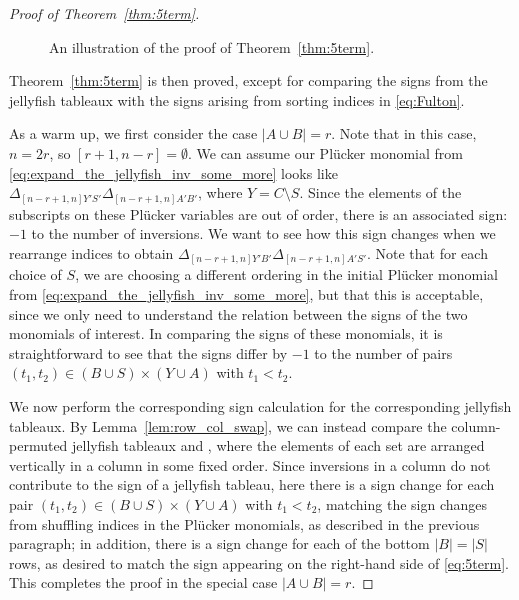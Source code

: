 \documentclass[10pt]{amsart}
\theoremstyle{definition}
\theoremstyle{plain}
\theoremstyle{plain}
\theoremstyle{definition}
\theoremstyle{remark}
\theoremstyle{plain}
\theoremstyle{plain}
\theoremstyle{plain}
\numberwithin{equation}{section}
\begin{document}
\begin{proof}[Proof of Theorem~\ref{thm:5term}]
\begin{figure}[htb]
    \centering
    \caption{An illustration of the proof of Theorem~\ref{thm:5term}.}
    \label{fig:jellyfish_sign_calc}
\end{figure}

Theorem~\ref{thm:5term} is then proved, except for comparing the signs from the jellyfish tableaux with the signs arising from sorting indices in \eqref{eq:Fulton}. 

As a warm up, we first consider the case $|A \cup B| = r$. Note that in this case, $n=2r$, so $[r+1,n-r]=\emptyset$.  We can assume our  Pl\"ucker monomial from \eqref{eq:expand_the_jellyfish_inv_some_more} looks like $\Delta_{[n-r+1,n]  Y'S'}\Delta_{[n-r+1,n]  A'B'}$, where $Y = C \setminus S$. Since the elements of the subscripts on these Pl\"ucker variables are out of order, there is an associated sign: $-1$ to the number of inversions. We want to see how this sign changes when we rearrange indices to obtain $\Delta_{[n-r+1,n]  Y'B'} \Delta_{[n-r+1,n]  A'S'}$.  Note that for each choice of $S$, we are choosing a different ordering in the initial Pl\"ucker monomial from \eqref{eq:expand_the_jellyfish_inv_some_more}, but that this is acceptable, since we only need to understand the relation between the signs of the two monomials of interest. In comparing the signs of these monomials, it is straightforward to see that the signs differ by $-1$ to the number of pairs $(t_1, t_2) \in (B \cup S) \times (Y \cup A)$ with $t_1 < t_2$.

We now perform the corresponding sign calculation for the corresponding jellyfish tableaux.
By Lemma~\ref{lem:row_col_swap}, we can instead compare the column-permuted jellyfish tableaux 
 and  , where the elements of each set are arranged vertically in a column in some fixed order. Since inversions in a column do not contribute to the sign of a jellyfish tableau, here there is a sign change for each pair $(t_1, t_2) \in (B \cup S) \times (Y \cup A)$ with $t_1 < t_2$, matching the sign changes from shuffling indices in the Pl\"ucker monomials, as described in the previous paragraph; in addition, there is a sign change for each of the bottom $|B| = |S|$ rows, as desired to match the sign appearing on the right-hand side of \eqref{eq:5term}. This completes the proof in the special case $|A \cup B| = r$.


\end{proof}
\end{document}
